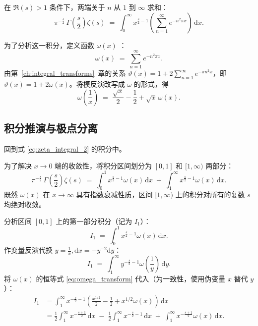 在 $\Re(s)>1$ 条件下，两端关于 $n$ 从 $1$ 到 $\infty$ 求和：
\begin{equation}
\label{eq:zeta_integral_2}
  \pi^{-\frac{s}{2}} \, \Gamma\!\left(\frac{s}{2}\right) \zeta(s)
  \;=\;  \int_0^{\infty} x^{\frac{s}{2}-1} \left( \sum_{n=1}^{\infty} e^{-n^2 \pi x} \right) \,\mathrm{d}x.
\end{equation}

为了分析这一积分，定义函数 $\omega(x)$ ：
\[
  \omega(x) \;=\; \sum_{n=1}^{\infty} e^{-n^2 \pi x}.
\]
由第~\ref{ch:integral_transforms}~章的关系 $\vartheta(x)=1+2\sum_{n=1}^{\infty}e^{-\pi n^2 x}$，即
$\vartheta(x) = 1 + 2\omega(x)$。将模反演改写成 $\omega$ 的形式，得
\begin{equation}
\label{eq:omega_transform}
  \omega\!\left(\frac{1}{x}\right) \;=\; \frac{\sqrt{x}}{2} - \frac{1}{2} + \sqrt{x}\,\omega(x).
\end{equation}

\subsection{积分推演与极点分离}

回到式 \eqref{eq:zeta_integral_2} 的积分中。

为了解决 $x \to 0$ 端的收敛性，将积分区间划分为 $[0, 1]$ 和 $[1, \infty)$ 两部分：
\[
  \pi^{-\frac{s}{2}} \, \Gamma\!\left(\frac{s}{2}\right) \zeta(s) \;=\;  \int_0^1 x^{\frac{s}{2}-1} \omega(x) \,\mathrm{d}x \;+\;  \int_1^{\infty} x^{\frac{s}{2}-1} \omega(x) \,\mathrm{d}x.
\]
既然 $\omega(x)$ 在 $x \to \infty$ 具有指数衰减性质，区间 $[1, \infty)$ 上的积分对所有的复数 $s$ 均绝对收敛。

分析区间 $[0, 1]$ 上的第一部分积分（记为 $I_1$）：
\[
  I_1 \;=\;  \int_0^1 x^{\frac{s}{2}-1} \omega(x) \,\mathrm{d}x.
\]
作变量反演代换 $y = \frac{1}{x}, \mathrm{d}x = -y^{-2}\mathrm{d}y$：
\[
  I_1 \;=\;  \int_1^{\infty} y^{-\frac{s}{2}-1} \omega\!\left(\frac{1}{y}\right) \,\mathrm{d}y.
\]
将 $\omega(x)$ 的恒等式 \eqref{eq:omega_transform} 代入（为一致性，使用伪变量 $x$ 替代 $y$）：
\begin{align*}
  I_1
  &=  \int_1^{\infty} x^{-\frac{s}{2}-1} \left( \frac{x^{1/2}}{2} - \frac{1}{2} + x^{1/2}\omega(x) \right) \,\mathrm{d}x \\
  &= \frac{1}{2}  \int_1^{\infty} x^{-\frac{s+1}{2}} \,\mathrm{d}x \;-\; \frac{1}{2}  \int_1^{\infty} x^{-\frac{s}{2}-1} \,\mathrm{d}x \;+\;  \int_1^{\infty} x^{-\frac{s+1}{2}} \omega(x) \,\mathrm{d}x.
\end{align*}

